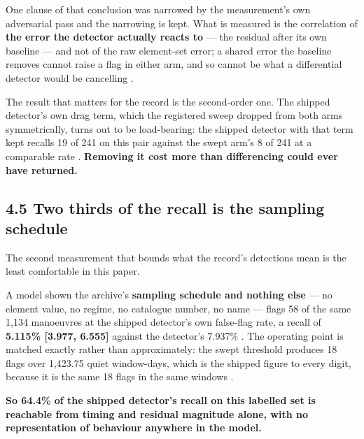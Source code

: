 \documentclass[11pt]{article}
\begin{document}
One clause of that conclusion was narrowed by the measurement's own adversarial pass and the narrowing is kept. What is measured is the correlation of \textbf{the error the detector actually reacts to} --- the residual after its own baseline --- and not of the raw element-set error; a shared error the baseline removes cannot raise a flag in either arm, and so cannot be what a differential detector would be cancelling%
.

The result that matters for the record is the second-order one. The shipped detector's own drag term, which the registered sweep dropped from both arms symmetrically, turns out to be load-bearing: the shipped detector with that term kept recalls 19 of 241 on this pair against the swept arm's 8 of 241 at a comparable rate%
. \textbf{Removing it cost more than differencing could ever have returned.}

\subsection*{4.5 Two thirds of the recall is the sampling schedule}

The second measurement that bounds what the record's detections mean is the least comfortable in this paper.

A model shown the archive's \textbf{sampling schedule and nothing else} --- no element value, no regime, no catalogue number, no name --- flags 58 of the same 1,134 manoeuvres at the shipped detector's own false-flag rate, a recall of \textbf{5.115\% [3.977, 6.555]} against the detector's 7.937\%%
. The operating point is matched exactly rather than approximately: the swept threshold produces 18 flags over 1,423.75 quiet window-days, which is the shipped figure to every digit, because it is the same 18 flags in the same windows%
.

\textbf{So 64.4\% of the shipped detector's recall on this labelled set is reachable from timing and residual magnitude alone, with no representation of behaviour anywhere in the model.}
\end{document}
